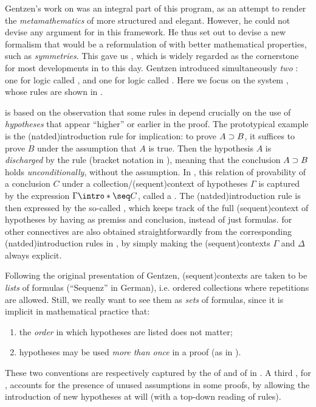 \AP
Gentzen's work on  was an integral part of this program,
as an attempt to render the \emph{metamathematics} of  more
structured and elegant. However, he could not devise any argument for
 in this framework. He thus set out to devise a new formalism
that would be a reformulation of  with better mathematical
properties, such as \emph{symmetries}. This gave us ,
which is widely regarded as the cornerstone for most developments in  to this day. Gentzen introduced simultaneously \emph{two} : one for  logic called , and one for
 logic called . Here we focus on the
 system , whose rules are shown in
.

\AP
{} is based on the observation that some rules in  depend crucially on the use of \emph{hypotheses} that appear
``higher'' or earlier in the proof. The prototypical example is the
\kl(natded){introduction rule}  for implication: to prove $A \supset
B$, it suffices to prove $B$ under the assumption that $A$ is true. Then the
hypothesis $A$ is \emph{discharged} by the rule (bracket notation in
), meaning that the conclusion $A \supset B$ holds
\emph{unconditionally}, without the assumption. In , this
relation of provability of a conclusion $C$ under a
collection/\intro(sequent){context} of hypotheses $\Gamma$ is captured by the
expression $\Gamma \intro*\seq C$, called a . The
\kl(natded){introduction rule}  is then expressed by the so-called
 , which keeps track of the full
\kl(sequent){context} of hypotheses by having  as premiss and
conclusion, instead of just formulas.  for other
connectives are also obtained straightforwardly from the corresponding
\kl(natded){introduction rules} in , by simply making the
\kl(sequent){contexts} $\Gamma$ and $\Delta$ always explicit.

\AP
Following the original presentation of Gentzen, \kl(sequent){contexts} are taken
to be \emph{lists} of formulas (``Sequenz'' in German), i.e. ordered collections
where repetitions are allowed. Still, we really want to see them as \emph{sets}
of formulas, since it is implicit in mathematical practice that:
\begin{enumerate}
\item the \emph{order} in which hypotheses are listed does not matter;
\item hypotheses may be used \emph{more than once} in a proof (as in
).
\end{enumerate}
These two conventions are respectively captured by the 
 of  and  of  in
. A third ,  for
, accounts for the presence of unused assumptions in some
proofs, by allowing the introduction of new hypotheses at will (with a top-down
reading of rules).


